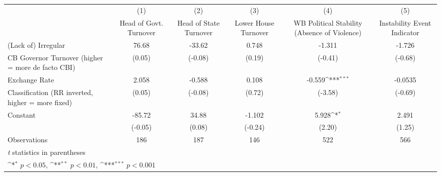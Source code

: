 {
\def\sym#1{\ifmmode^{#1}\else\(^{#1}\)\fi}
\begin{tabular}{l*{5}{c}}
\hline\hline
                    &\multicolumn{1}{c}{(1)}&\multicolumn{1}{c}{(2)}&\multicolumn{1}{c}{(3)}&\multicolumn{1}{c}{(4)}&\multicolumn{1}{c}{(5)}\\
                    &\multicolumn{1}{c}{Head of Govt. Turnover}&\multicolumn{1}{c}{Head of State Turnover}&\multicolumn{1}{c}{Lower House Turnover}&\multicolumn{1}{c}{WB Political Stability (Absence of Violence)}&\multicolumn{1}{c}{Instability Event Indicator}\\
\hline
(Lack of) Irregular &       76.68         &      -33.62         &       0.748         &      -1.311         &      -1.726         \\
CB Governor Turnover (higher = more de facto CBI)&      (0.05)         &     (-0.08)         &      (0.19)         &     (-0.41)         &     (-0.68)         \\
[1em]
Exchange Rate       &       2.058         &      -0.588         &       0.108         &      -0.559\sym{***}&     -0.0535         \\
Classification (RR inverted, higher = more fixed)&      (0.05)         &     (-0.08)         &      (0.72)         &     (-3.58)         &     (-0.69)         \\
[1em]
Constant            &      -85.72         &       34.88         &      -1.102         &       5.928\sym{*}  &       2.491         \\
                    &     (-0.05)         &      (0.08)         &     (-0.24)         &      (2.20)         &      (1.25)         \\
\hline
Observations        &         186         &         187         &         146         &         522         &         566         \\
\hline\hline
\multicolumn{6}{l}{\footnotesize \textit{t} statistics in parentheses}\\
\multicolumn{6}{l}{\footnotesize \sym{*} \(p<0.05\), \sym{**} \(p<0.01\), \sym{***} \(p<0.001\)}\\
\end{tabular}
}
